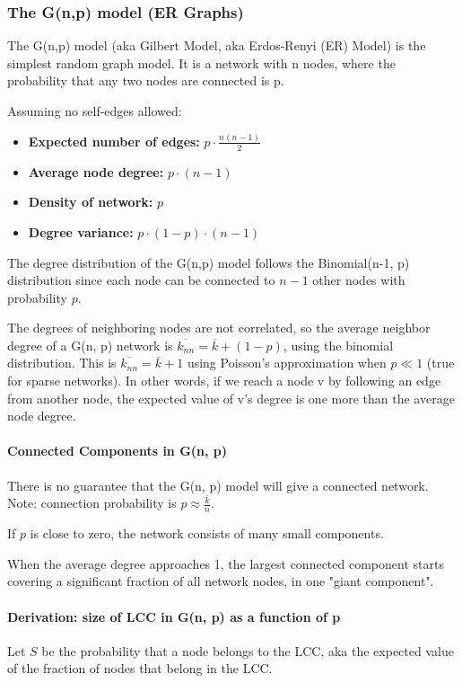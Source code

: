\documentclass[11pt]{scrartcl} %
\begin{document}
\subsubsection{The G(n,p) model (ER Graphs)}
The G(n,p) model (aka Gilbert Model, aka Erdos-Renyi (ER) Model) is the simplest random graph model. It is a network with n nodes, where the probability that any two nodes are connected is p.

Assuming no self-edges allowed:
\begin{itemize}
	\item \textbf{Expected number of edges:} $p \cdot \frac{n(n-1)}{2}$
	\item \textbf{Average node degree:} $p \cdot (n-1)$
	\item \textbf{Density of network:} $p$
	\item \textbf{Degree variance:} $p \cdot (1-p) \cdot (n-1)$
\end{itemize}

The degree distribution of the G(n,p) model follows the Binomial(n-1, p) distribution since each node can be connected to $n-1$ other nodes with probability $p$.

The degrees of neighboring nodes are not correlated, so the average neighbor degree of a G(n, p) network is $\overline{k_{nn}} = \overline{k} + (1-p)$, using the binomial distribution. This is $\overline{k_{nn}} = \overline{k} + 1$ using Poisson's approximation when $p \ll 1$ (true for sparse networks). In other words, if we reach a node v by following an edge from another node, the expected value of v’s degree is one more than the average node degree. 

\paragraph{Connected Components in G(n, p)}
There is no guarantee that the G(n, p) model will give a connected network. Note: connection probability is $p \approx \frac{\bar{k}}{n}$.

If $p$ is close to zero, the network consists of many small components. 

When the average degree approaches 1, the largest connected component starts covering a significant fraction of all network nodes, in one "giant component".

\paragraph{Derivation: size of LCC in G(n, p) as a function of p}
Let $S$ be the probability that a node belongs to the LCC, aka the expected value of the fraction of nodes that belong in the LCC.
\end{document}
